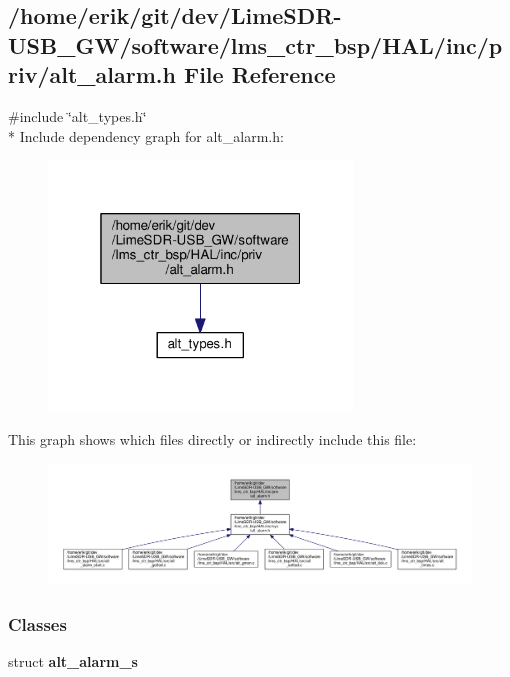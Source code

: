 \subsection{/home/erik/git/dev/\+Lime\+S\+D\+R-\/\+U\+S\+B\+\_\+\+G\+W/software/lms\+\_\+ctr\+\_\+bsp/\+H\+A\+L/inc/priv/alt\+\_\+alarm.h File Reference}
\label{priv_2alt__alarm_8h}
{\ttfamily \#include \char`\"{}alt\+\_\+types.\+h\char`\"{}}\\*
Include dependency graph for alt\+\_\+alarm.\+h\+:
\nopagebreak
\begin{figure}[H]
\begin{center}
\leavevmode
\includegraphics[width=229pt]{da/d14/priv_2alt__alarm_8h__incl}
\end{center}
\end{figure}
This graph shows which files directly or indirectly include this file\+:
\nopagebreak
\begin{figure}[H]
\begin{center}
\leavevmode
\includegraphics[width=350pt]{da/d45/priv_2alt__alarm_8h__dep__incl}
\end{center}
\end{figure}
\subsubsection*{Classes}
\begin{DoxyCompactItemize}
\item 
struct {\bf alt\+\_\+alarm\+\_\+s}
\end{DoxyCompactItemize}

